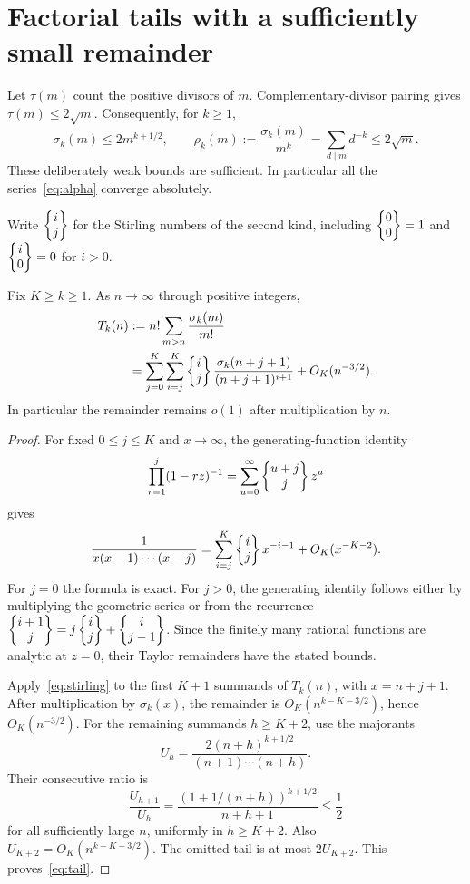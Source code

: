 \section{Factorial tails with a sufficiently small remainder}
Let $\tau(m)$ count the positive divisors of $m$. Complementary-divisor
pairing gives $\tau(m)\leq2\sqrt m$. Consequently, for $k\geq1$,
\begin{equation}\label{eq:crude}
 \sigma_k(m)\leq 2m^{k+1/2},\qquad
 \rho_k(m):=\frac{\sigma_k(m)}{m^k}
      =\sum_{d\mid m}d^{-k}\leq2\sqrt m.
\end{equation}
These deliberately weak bounds are sufficient. In particular all the
series~\eqref{eq:alpha} converge absolutely.

Write $\left\{\begin{matrix}i\\j\end{matrix}\right\}$ for the Stirling numbers of the second kind,
including $\left\{\begin{matrix}0\\0\end{matrix}\right\}=1$ and $\left\{\begin{matrix}i\\0\end{matrix}\right\}=0$ for $i>0$.

\begin{lemma}\label{lem:tail}
Fix $K\geq k\geq1$. As $n\to\infty$ through positive integers,
\begin{align}\label{eq:tail}
 T_k(n)&:=n!\sum_{m>n}\frac{\sigma_k(m)}{m!}\\
 &=\sum_{j=0}^{K}\sum_{i=j}^{K}
      \left\{\begin{matrix}i\\j\end{matrix}\right\}\frac{\sigma_k(n+j+1)}{(n+j+1)^{i+1}}
       +O_K(n^{-3/2}).\nonumber
\end{align}
In particular the remainder remains $o(1)$ after multiplication by $n$.
\end{lemma}
\begin{proof}
For fixed $0\leq j\leq K$ and $x\to\infty$, the generating-function
identity
\[
 \prod_{r=1}^{j}(1-rz)^{-1}
       =\sum_{u=0}^{\infty}\left\{\begin{matrix}u+j\\j\end{matrix}\right\}z^u
\]
gives
\begin{equation}\label{eq:stirling}
 \frac{1}{x(x-1)\cdots(x-j)}
   =\sum_{i=j}^{K}\left\{\begin{matrix}i\\j\end{matrix}\right\}x^{-i-1}
       +O_K(x^{-K-2}).
\end{equation}
For $j=0$ the formula is exact. For $j>0$, the generating identity
follows either by multiplying the geometric series or from the
recurrence $\left\{\begin{matrix}i+1\\j\end{matrix}\right\}=j\left\{\begin{matrix}i\\j\end{matrix}\right\}+\left\{\begin{matrix}i\\j-1\end{matrix}\right\}$.
Since the finitely many rational functions are analytic at $z=0$,
their Taylor remainders have the stated bounds.

Apply~\eqref{eq:stirling} to the first $K+1$ summands of $T_k(n)$,
with $x=n+j+1$. After multiplication by $\sigma_k(x)$, the remainder
is $O_K(n^{k-K-3/2})$, hence $O_K(n^{-3/2})$.
For the remaining summands $h\geq K+2$, use the majorants
\[
 U_h=\frac{2(n+h)^{k+1/2}}{(n+1)\cdots(n+h)}.
\]
Their consecutive ratio is
\[
 \frac{U_{h+1}}{U_h}
 =\frac{(1+1/(n+h))^{k+1/2}}{n+h+1}\leq\frac12
\]
for all sufficiently large $n$, uniformly in $h\geq K+2$.
Also $U_{K+2}=O_K(n^{k-K-3/2})$. The omitted tail is at most
$2U_{K+2}$. This proves~\eqref{eq:tail}.
\end{proof}

